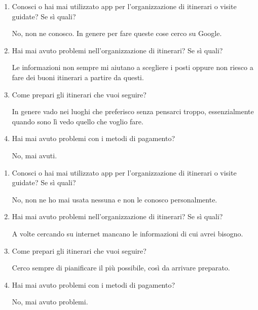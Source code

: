 \begin{enumerate}

\item Conosci o hai mai utilizzato app per l'organizzazione di itinerari o visite guidate? Se sì quali?

No, non ne conosco. In genere per fare queste cose cerco su Google.

\item Hai mai avuto problemi nell'organizzazione di itinerari? Se sì quali?

Le informazioni non sempre mi aiutano a scegliere i posti oppure non riesco a fare dei buoni itinerari a partire da questi.

\item Come prepari gli itinerari che vuoi seguire?

In genere vado nei luoghi che preferisco senza pensarci troppo, essenzialmente quando sono lì vedo quello che voglio fare.

\item Hai mai avuto problemi con i metodi di pagamento?

No, mai avuti.

\end{enumerate}

\clearpage
{}

\begin{enumerate}

\item Conosci o hai mai utilizzato app per l'organizzazione di itinerari o visite guidate? Se sì quali?

No, non ne ho mai usata nessuna e non le conosco personalmente.

\item Hai mai avuto problemi nell'organizzazione di itinerari? Se sì quali?

A volte cercando su internet mancano le informazioni di cui avrei bisogno.

\item Come prepari gli itinerari che vuoi seguire?

Cerco sempre di pianificare il più possibile, così da arrivare preparato.

\item Hai mai avuto problemi con i metodi di pagamento?

No, mai avuto problemi.

\end{enumerate}

\clearpage
{}

